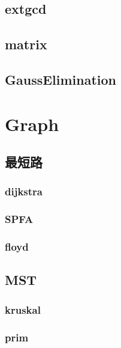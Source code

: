 \subsection{extgcd}


\subsection{matrix}


\subsection{GaussElimination}


\section{Graph}

\subsection{最短路}
\subsubsection{dijkstra}


\subsubsection{SPFA}


\subsubsection{floyd}


\subsection{MST}
\subsubsection{kruskal}


\subsubsection{prim}


